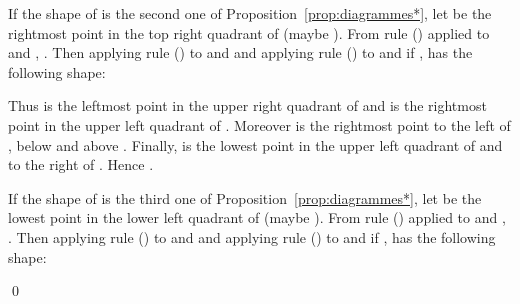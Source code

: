 \documentclass[11pt]{article}
\newenvironment{pf}{{\em \noindent Proof:}}{ \hfill \qed\smallskip}
\newcommand{\rmnum}[1]{\romannumeral #1}
\newcommand{\Vpoint}[2]{\draw (#1,#2) [darkgreen,fill=darkgreen] circle (3pt);}
\newcommand{\Hpoint}[2]{\draw (#1,#2) [darkred,fill=darkred] circle (3pt);}
\newcommand{\zoneRG}[3]{
\draw [very thick,H,Hpoint] (#1,#2) -- +(-#3,0);
\draw [very thick,V,Vpoint] (#1,#2) -- +(0,#3);
\draw [Hfill] (#1,#2) -- +(-#3,#3) -- +(-#3,0);
\draw [Vfill] (#1,#2) -- +(-#3,#3) -- + (0,#3);
}
\newcommand{\zoneGR}[3]{
\draw [very thick,H,Hpoint] (#1,#2) -- +(-#3,0);
\draw [very thick,V,Vpoint] (#1,#2) -- +(0,#3);
\draw [Vfill] (#1,#2) -- +(-#3,#3) -- +(-#3,0);
\draw [Hfill] (#1,#2) -- +(-#3,#3) -- + (0,#3);
}
\begin{document}
\begin{pf}
If the shape of  is the second one of Proposition~\ref{prop:diagrammes*}, 
let  be the rightmost point in the top right quadrant of  (maybe ).
From rule (\rmnum{8}) applied to  and , .
Then applying rule (\rmnum{2}) to  and  
and applying rule (\rmnum{1}) to  and  if ,  has the following shape:

\begin{minipage}{.2\textwidth}
\end{minipage}
\begin{minipage}{.75\textwidth}
Thus  is the leftmost point in the upper right quadrant of  and
 is the rightmost point in the upper left quadrant of .
Moreover  is the rightmost point to the left of , below  and above . 
Finally,  is the lowest point in the upper left quadrant of  and to the right of . 
Hence .
\end{minipage}

If the shape of  is the third one of Proposition~\ref{prop:diagrammes*}, 
let  be the lowest point in the lower left quadrant of  (maybe ).
From rule (\rmnum{7}) applied to  and , .
Then applying rule (\rmnum{1}) to  and  
and applying rule (\rmnum{2}) to  and  if ,  has the following shape: 


\end{pf}
\end{document}
